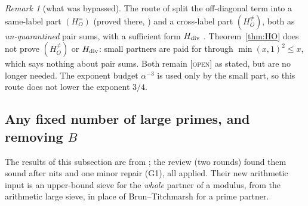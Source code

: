 \documentclass[10pt,reqno]{amsart}
\theoremstyle{definition}
\theoremstyle{remark}
\newtheorem{remark}[theorem]{Remark}
\newcommand{\lab}[1]{\textup{[\textsc{#1}]}}
\begin{document}
\begin{remark}[what was bypassed]\label{rem:bypass}
The route of \cite{TW2} split the off-diagonal term into a same-label part
$(H_O^=)$ (proved there, \cite[Lemma~5.4]{TW2}) and a cross-label part
$(H_O^{\neq})$, both as \emph{un-quarantined} pair sums, with a sufficient
form $H_{\rm div}$ \cite[\S5.5]{TW2}.  Theorem~\ref{thm:HO} does not prove
$(H_O^{\neq})$ or $H_{\rm div}$: small partners are paid for through
$\min(x,1)^2\leq x$, which says nothing about pair sums.  Both remain
\lab{open} as stated, but are no longer needed.  The exponent budget
$\alpha^{-3}$ is used only by the small part, so this route does not
lower the exponent $3/4$.
\end{remark}

\subsection{Any fixed number of large primes, and removing \texorpdfstring{$B$}{B}}
The results of this subsection are from \cite{TW4}; the review
\cite{TW4rev} (two rounds) found them sound after nits and one minor
repair (G1), all applied.  Their new arithmetic input is an upper-bound
sieve for the \emph{whole} partner of a modulus, from the arithmetic large
sieve, in place of Brun--Titchmarsh for a prime partner.
\end{document}
